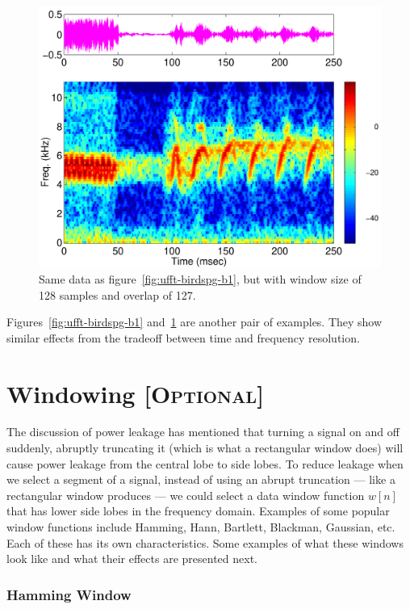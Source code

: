 \begin{figure}[p]
\centerline{\includegraphics[height=0.4\textheight]{ch-fft/ufft_bluewing1am_spg128_127}}
\caption[Bird call waveform; 128 sample window, overlap 127]{Same data
  as figure~\protect\ref{fig:ufft-birdspg-b1}, but with window size of
  128 samples and overlap of 127.\label{fig:ufft-birdspg-b2}}
\end{figure}

Figures~\ref{fig:ufft-birdspg-b1} and~\ref{fig:ufft-birdspg-b2} are
another pair of examples. They show similar effects from the tradeoff
between time and frequency resolution.

\section{Windowing [\textsc{Optional}]}

The discussion of power leakage has mentioned that turning a signal
on and off suddenly, abruptly truncating it (which is what a
rectangular window does) will cause power leakage from the central
lobe to side lobes. To reduce leakage when we select a segment of a
signal, instead of using an abrupt truncation --- like a rectangular
window produces --- we could select a data window function $w[n]$ that
has lower side lobes in the frequency domain. Examples of some popular
window functions include Hamming, Hann, Bartlett, Blackman, Gaussian,
etc. Each of these has its own characteristics. Some
examples of what these windows look like and what their effects are
presented next.

\subsubsection{Hamming Window}

